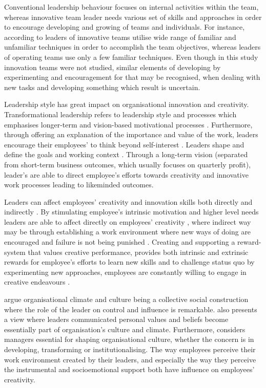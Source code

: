 Conventional leadership behaviour focuses on internal activities within the team, whereas innovative team leader needs various set of skills and approaches in order to encourage developing and growing of teams and individuals. For instance, according to \citet{barczak1989leadership} leaders of innovative teams utilise wide range of familiar and unfamiliar techniques in order to accomplish the team objectives, whereas leaders of operating teams use only a few familiar techniques. Even though in this study innovation teams were not studied, similar elements of developing by experimenting and encouragement for that may be recognised, when dealing with new tasks and developing something which result is uncertain. 

Leadership style has great impact on organisational innovation and creativity. Transformational leadership refers to leadership style and processes which emphasises longer-term and vision-based motivational processes \citep{bass1997full}. Furthermore, through offering an explanation of the importance and value of the work, leaders encourage their employees' to think beyond self-interest \citep{yukl2002leadership}. Leaders shape and define the goals and working context \citep{amabile1998kill, redmond1993putting}. Through a long-term vision (separated from short-term business outcomes, which usually focuses on quarterly profit), leader's are able to direct employee's efforts towards creativity and innovative work processes leading to likeminded outcomes\citep{amabile1996assessing}.

Leaders can affect employees' creativity and innovation skills both directly and indirectly \citep{jung2003role}. By stimulating employee's intrinsic motivation and higher level needs leaders are able to affect directly on employees' creativity \citep{tierney1999examination}, where indirect way may be through establishing a work environment where new ways of doing are encouraged and failure is not being punished \citep{amabile1996assessing}. Creating and supporting a reward-system that values creative performance, provides both intrinsic and extrinsic rewards for employee's efforts to learn new skills and to challenge status quo by experimenting new approaches, employees are constantly willing to engage in creative endeavours \citep{jung2001transformational,mumford1988creativity}.

\citep{mumford2002leading} argue organisational climate and culture being a collective social construction where the role of the leader on control and influence is remarkable. \citep{schein2010organizational} also presents a view where leaders communicated personal values and beliefs become essentially part of organisation's culture and climate. Furthermore,\citep{jung2001transformational} considers managers essential for shaping organisational culture, whether the concern is in developing, transforming or institutionalising. The way employees perceive their work environment created by their leaders, and especially the way they perceive the instrumental and socioemotional support both have influence on employees' creativity. \citep{oldham1996employee}

